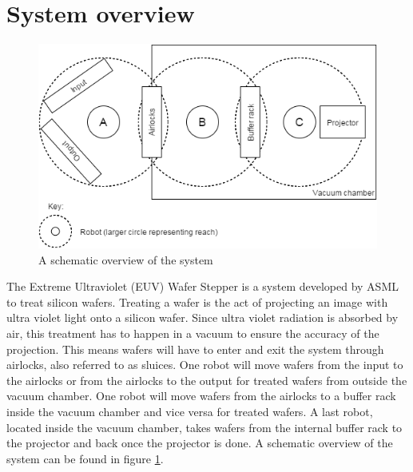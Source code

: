 \documentclass[12pt]{report}
\begin{document}
	\section{System overview}
	\begin{figure}
		\centering
		\includegraphics[scale=0.7]{schematicoverview}
		\caption{A schematic overview of the system}
		\label{fig:overview}
	\end{figure}
	The Extreme Ultraviolet (EUV) Wafer Stepper is a system developed by ASML to treat silicon wafers. Treating a wafer is the act of projecting an image with ultra violet light onto a silicon wafer. Since ultra violet radiation is absorbed by air, this treatment has to happen in a vacuum to ensure the accuracy of the projection. This means wafers will have to enter and exit the system through airlocks, also referred to as sluices. One robot will move wafers from the input to the airlocks or from the airlocks to the output for treated wafers from outside the vacuum chamber. One robot will move wafers from the airlocks to a buffer rack inside the vacuum chamber and vice versa for treated wafers. A last robot, located inside the vacuum chamber, takes wafers from the internal buffer rack to the projector and back once the projector is done. A schematic overview of the system can be found in figure \ref{fig:overview}.
\end{document}

